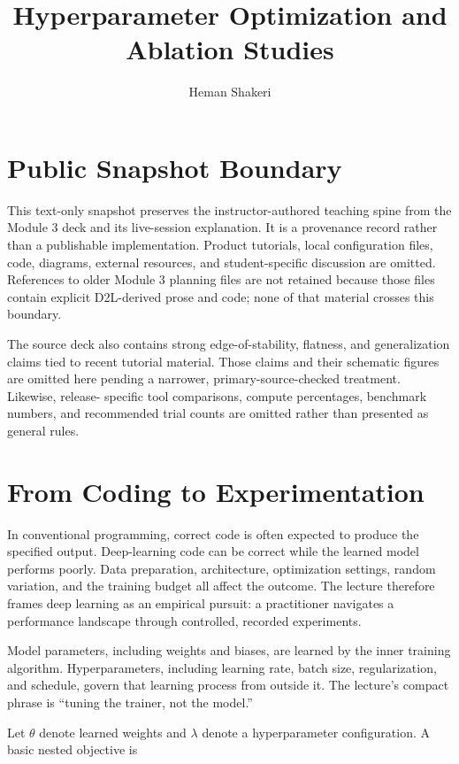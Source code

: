 \documentclass{article}
\title{Hyperparameter Optimization and Ablation Studies}
\author{Heman Shakeri}
\date{}
\begin{document}
\maketitle

\section*{Public Snapshot Boundary}

This text-only snapshot preserves the instructor-authored teaching spine from the
Module 3 deck and its live-session explanation. It is a provenance record rather than
a publishable implementation. Product tutorials, local configuration files, code,
diagrams, external resources, and student-specific discussion are omitted. References
to older Module 3 planning files are not retained because those files contain explicit
D2L-derived prose and code; none of that material crosses this boundary.

The source deck also contains strong edge-of-stability, flatness, and generalization
claims tied to recent tutorial material. Those claims and their schematic figures are
omitted here pending a narrower, primary-source-checked treatment. Likewise, release-
specific tool comparisons, compute percentages, benchmark numbers, and recommended
trial counts are omitted rather than presented as general rules.

\section{From Coding to Experimentation}

In conventional programming, correct code is often expected to produce the specified
output. Deep-learning code can be correct while the learned model performs poorly.
Data preparation, architecture, optimization settings, random variation, and the
training budget all affect the outcome. The lecture therefore frames deep learning as
an empirical pursuit: a practitioner navigates a performance landscape through
controlled, recorded experiments.

Model parameters, including weights and biases, are learned by the inner training
algorithm. Hyperparameters, including learning rate, batch size, regularization, and
schedule, govern that learning process from outside it. The lecture's compact phrase
is ``tuning the trainer, not the model.''

Let $\theta$ denote learned weights and $\lambda$ denote a hyperparameter
configuration. A basic nested objective is
\end{document}
